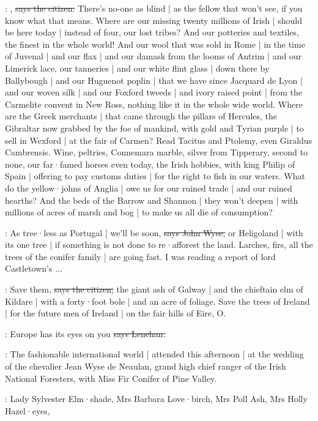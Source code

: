 \citizen:
,
\sout{says the citizen.}
There's no-one as blind |
as the fellow that won't see,
if you know what that means.
Where are our missing twenty millions of Irish |
should be here today |
instead of four,
our lost tribes?
And our potteries and textiles,
the finest in the whole world!
And our wool that was sold in Rome |
in the time of Juvenal |
and our flax |
and our damask from the looms of Antrim |
and our Limerick lace,
our tanneries |
and our white flint glass |
down there by Ballybough |
and our Huguenot poplin |
that we have since Jacquard de Lyon |
and our woven silk |
and our Foxford tweeds |
and ivory raised point |
from the Carmelite convent in New Ross,
nothing like it in the whole wide world.
Where are the Greek merchants |
that came through the pillars of Hercules,
the Gibraltar now grabbed by the foe of mankind,
with gold and Tyrian purple |
to sell in Wexford |
at the fair of Carmen?
Read Tacitus and Ptolemy,
even Giraldus Cambrensis.
Wine,
peltries,
Connemara marble,
silver from Tipperary,
second to none,
our far·famed horses even today,
the Irish hobbies,
with king Philip of Spain |
offering to pay customs duties |
for the right to fish in our waters.
What do the yellow·johns of Anglia |
owe us for our ruined trade |
and our ruined hearths?
And the beds of the Barrow and Shannon |
they won't deepen |
with millions of acres of marsh and bog |
to make us all die of consumption?

\johnwyse:
As tree·less as Portugal |
we'll be soon,
\sout{says John Wyse,}
or Heligoland |
with its one tree |
if something is not done to re·afforest the land.
Larches,
firs,
all the trees of the conifer family |
are going fast.
I was reading a report of lord Castletown's ...

\citizen:
Save them,
\sout{says the citizen,}
the giant ash of Galway |
and the chieftain elm of Kildare |
with a forty·foot bole |
and an acre of foliage.
Save the trees of Ireland |
for the future men of Ireland |
on the fair hills of Eire,
O.

\lenehan:
Europe has its eyes on you
\sout{says Lenehan.}

:
The fashionable international world |
attended  this afternoon |
at the wedding of the chevalier Jean Wyse de Neaulan,
grand high chief
ranger of the Irish National Foresters,
with Miss Fir Conifer of Pine Valley.

:
Lady Sylvester Elm·shade,
Mrs Barbara Love·birch,
Mrs Poll Ash,
Mrs Holly Hazel·eyes,

